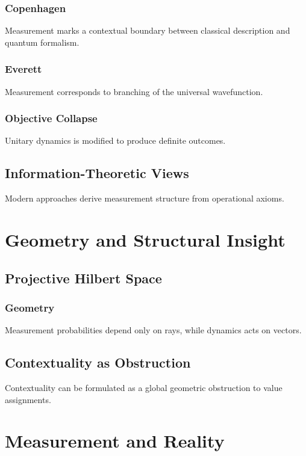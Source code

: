 \documentclass[12pt]{book}
\theoremstyle{plain}
\theoremstyle{definition}
\theoremstyle{remark}
\begin{document}
\section{Copenhagen}
Measurement marks a contextual boundary between classical description and quantum formalism.

\section{Everett}
Measurement corresponds to branching of the universal wavefunction.

\section{Objective Collapse}
Unitary dynamics is modified to produce definite outcomes.

\chapter{Information-Theoretic Views}
Modern approaches derive measurement structure from operational axioms.

\part{Geometry and Structural Insight}

\chapter{Projective Hilbert Space}

\section{Geometry}
Measurement probabilities depend only on rays, while dynamics acts on vectors.

\chapter{Contextuality as Obstruction}
Contextuality can be formulated as a global geometric obstruction to value assignments.

\part{Measurement and Reality}
\end{document}
